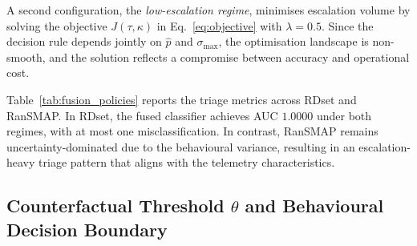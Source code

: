 \documentclass[lettersize,journal]{IEEEtran}
\begin{document}
A second configuration, the \emph{low-escalation regime}, minimises escalation volume by
solving the objective $J(\tau,\kappa)$ in Eq.~\eqref{eq:objective} with \(\lambda = 0.5\).
Since the decision rule depends jointly on \(\hat{p}\) and \(\sigma_{\max}\), the optimisation
landscape is non-smooth, and the solution reflects a compromise between accuracy and operational
cost.

Table~\ref{tab:fusion_policies} reports the triage metrics across RDset and RanSMAP. In RDset, the fused classifier achieves AUC \(1.0000\) under both regimes, with at most one misclassification. In contrast, RanSMAP remains uncertainty-dominated due to the behavioural variance, resulting in an escalation-heavy triage pattern that aligns with the telemetry characteristics.

\begin{table}[t]
\centering
{}
\caption{Fusion and triage performance under safety-optimal and low-escalation policies.}
\label{tab:fusion_policies}
\end{table}

\subsection{Counterfactual Threshold $\theta$ and Behavioural Decision Boundary}
\label{subsec:theta}
\end{document}
